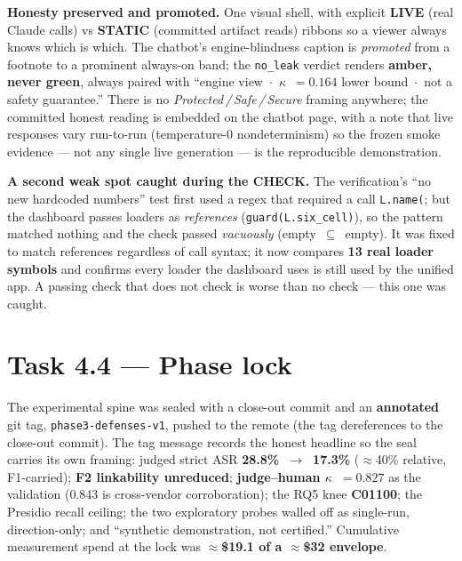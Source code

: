 \documentclass[11pt,a4paper]{article}
\newcommand{\kpa}{\ensuremath{\kappa}}
\begin{document}
\noindent\textbf{Honesty preserved and promoted.} One visual shell, with explicit \textbf{LIVE}
(real Claude calls) vs \textbf{STATIC} (committed artifact reads) ribbons so a viewer always knows
which is which. The chatbot's engine-blindness caption is \emph{promoted} from a footnote to a
prominent always-on band; the \texttt{no\_leak} verdict renders \textbf{amber, never green}, always
paired with ``engine view~$\cdot$~\kpa{}~$=0.164$ lower bound~$\cdot$~not a safety guarantee.'' There
is no \emph{Protected\,/\,Safe\,/\,Secure} framing anywhere; the committed honest reading is embedded
on the chatbot page, with a note that live responses vary run-to-run (temperature-0 nondeterminism)
so the frozen smoke evidence --- not any single live generation --- is the reproducible demonstration.

\begin{keyfinding}
\textbf{A second weak spot caught during the CHECK.} The verification's ``no new hardcoded numbers''
test first used a regex that required a call \texttt{L.name(}; but the dashboard passes loaders as
\emph{references} (\texttt{guard(L.six\_cell)}), so the pattern matched nothing and the check passed
\emph{vacuously} (empty~$\subseteq$~empty). It was fixed to match references regardless of call
syntax; it now compares \textbf{13 real loader symbols} and confirms every loader the dashboard uses
is still used by the unified app. A passing check that does not check is worse than no check --- this
one was caught.
\end{keyfinding}

\section{Task 4.4 --- Phase lock}

The experimental spine was sealed with a close-out commit and an \textbf{annotated} git tag,
\texttt{phase3-defenses-v1}, pushed to the remote (the tag dereferences to the close-out commit). The
tag message records the honest headline so the seal carries its own framing: judged strict ASR
\textbf{28.8\%~$\to$~17.3\%} ($\approx$40\% relative, F1-carried); \textbf{F2 linkability unreduced};
\textbf{judge--human \kpa{}~$=0.827$} as the validation (0.843 is cross-vendor corroboration); the
RQ5 knee \textbf{C01100}; the Presidio recall ceiling; the two exploratory probes walled off as
single-run, direction-only; and ``synthetic demonstration, not certified.'' Cumulative measurement
spend at the lock was \textbf{$\approx$\$19.1 of a $\approx$\$32 envelope}.
\end{document}
